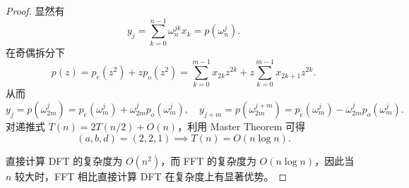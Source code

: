 \begin{proof}
    显然有
    \[
        y_j = \sum_{k = 0}^{n - 1} \omega_n^{jk} x_k = p(\omega_n^j).
    \]
    在奇偶拆分下
    \[
        p(z) = p_e(z^2) + z p_o(z^2) = \sum_{k = 0}^{m - 1} x_{2k} z^{2k} + z \sum_{k = 0}^{m - 1} x_{2k + 1} z^{2k}.
    \]
    从而
    \[
        y_j = p(\omega_{2m}^j) = p_e(\omega_m^j) + \omega_{2m}^j p_o(\omega_m^j), \quad
        y_{j + m} = p(\omega_{2m}^{j + m}) = p_e(\omega_m^j) - \omega_{2m}^j p_o(\omega_m^j).
    \]
    对递推式 $T(n) = 2T(n/2) + O(n)$，利用 Master Theorem 可得
    \[
        (a, b, d) = (2, 2, 1) \implies T(n) = O(n \log n).
    \]

    直接计算 DFT 的复杂度为 $O(n^2)$，而 FFT 的复杂度为 $O(n \log n)$，因此当 $n$ 较大时，FFT 相比直接计算 DFT 在复杂度上有显著优势。
\end{proof}
